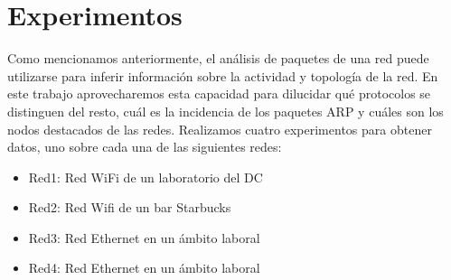 \section{Experimentos}

Como mencionamos anteriormente, el análisis de paquetes de una red puede utilizarse para inferir información sobre la actividad y topología de la red. En este trabajo aprovecharemos esta capacidad para dilucidar qué protocolos se distinguen del resto, cuál es la incidencia de los paquetes ARP y cuáles son los nodos destacados de las redes.
Realizamos cuatro experimentos para obtener datos, uno sobre cada una de las siguientes redes:
\begin{itemize}
	\item Red1: Red WiFi de un laboratorio del DC
	\item Red2: Red Wifi de un bar Starbucks
	\item Red3: Red Ethernet en un ámbito laboral
	\item Red4: Red Ethernet en un ámbito laboral
\end{itemize}

